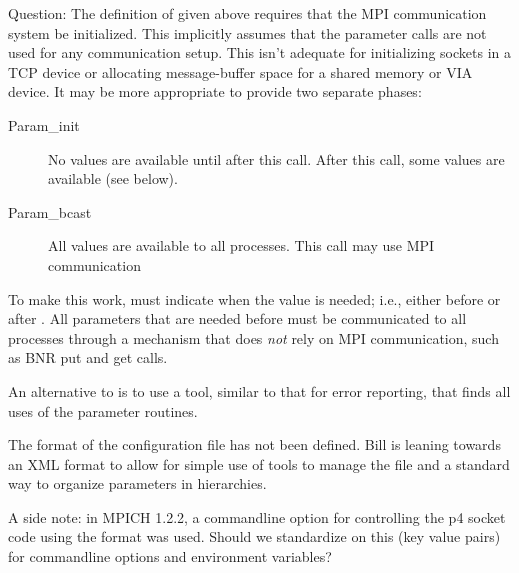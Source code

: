 \documentclass{article}
\begin{document}
Question: The definition of  given above
requires that the MPI communication system be initialized.  This
implicitly assumes that the parameter calls are not used for any
communication setup.  This isn't adequate for initializing sockets in
a TCP device or allocating message-buffer space for a shared memory or
VIA device.  It may be more appropriate to provide two separate
phases:
\begin{description}
\item[Param_init]No values are available until after this call.  
After this call, some values are available (see below).
\item[Param_bcast]All values are available to all processes.  This
call may use MPI communication
\end{description}
To make this work,  must indicate when the
value is needed; i.e., either before or after
.  All parameters that are needed before
 must be communicated to all processes through
a mechanism that does \emph{not} rely on MPI communication, such as
BNR put and get calls.  


An alternative to  is to use a tool, similar to that
for error reporting, that finds all uses of the parameter routines.


The format of the configuration file has not been defined.  Bill is leaning
towards an XML format to allow for simple use of tools to manage the file and
a standard way to organize parameters in hierarchies.

A side note: in MPICH 1.2.2, a commandline option for controlling the
p4 socket code using the format 
was used.  Should we standardize on this (key \code{=} value pairs)
for commandline options and environment variables?
\end{document}
